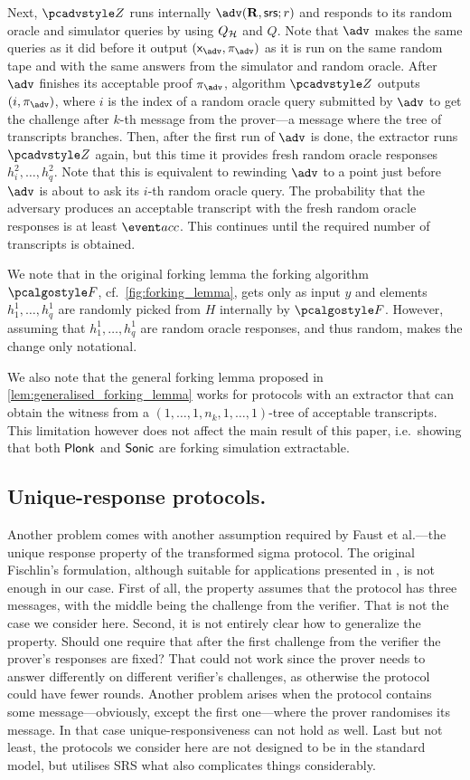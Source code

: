 \documentclass[runningheads,10pt]{llncs}
\begin{document}
Next, $\zdv$ runs internally $\advse(\REL, \srs; r)$ and responds to its random
oracle and simulator queries by using $Q_{\mathcal{H}}$ and $Q$. Note that $\advse$ makes
the same queries as it did before it output $(\inp_{\advse}, \zkproof_{\advse})$
as it is run on the same random tape and with the same answers from the
simulator and random oracle. After $\advse$ finishes its acceptable proof
$\zkproof_{\advse}$, algorithm $\zdv$ outputs $(i, \zkproof_{\advse})$, where
$i$ is the index of a random oracle query submitted by $\advse$ to get the challenge after
$k$-th message from the prover---a message where the tree of transcripts
branches.
Then, after the first run of $\advse$ is done, the extractor runs $\zdv$ again,
but this time it provides fresh random oracle responses $h^2_i, \ldots,
h^2_q$. Note that this is equivalent to rewinding $\advse$ to a point just
before $\advse$ is about to ask its $i$-th random oracle
query. The probability that the adversary produces an acceptable transcript with the
fresh random oracle responses is at least $\accProb$. This continues until the
required number of transcripts is obtained. 

We note that in the original forking lemma the forking algorithm $\forking$,
cf.~\cref{fig:forking_lemma}, gets only as input $y$ and elements $h^1_1, \ldots,
h^1_q$ are randomly picked from $H$ internally by $\forking$. However, assuming
that $h^1_1, \ldots, h^1_q$ are random oracle responses, and thus random, makes
the change only notational.

We also note that the general forking lemma proposed in
\cref{lem:generalised_forking_lemma} works for protocols with an extractor that can obtain the
witness from a $(1, \ldots, 1, n_k, 1, \ldots, 1)$-tree of acceptable
transcripts. This limitation however does not affect the main result of this
paper, i.e.~showing that both $\textnormal{\textsf{Plonk}}$ and ${\textnormal{\textsf{Sonic}}}$ are forking simulation extractable.

\subsection{Unique-response protocols.}
Another problem comes with another assumption required by Faust et al.---the
unique response property of the transformed sigma protocol. The original
Fischlin's formulation, although suitable for applications presented in
\cite{C:Fischlin05,INDOCRYPT:FKMV12}, is not enough in our case. First of all,
the property assumes that the protocol has three messages, with the middle being
the challenge from the verifier. That is not the case we consider here. Second,
it is not entirely clear how to generalize the property. Should one require that
after the first challenge from the verifier the prover's responses are fixed?
That could not work since the prover needs to answer differently on different
verifier's challenges, as otherwise the protocol could have fewer
rounds. Another problem arises when the protocol contains some
message---obviously, except the first one---where the prover randomises its
message. In that case unique-responsiveness can not hold as well. Last but not
least, the protocols we consider here are not designed to be in the standard
model, but utilises SRS what also complicates things considerably.
\end{document}
